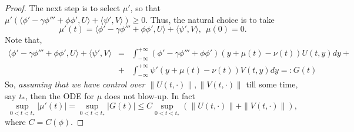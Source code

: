 \documentclass[12pt]{amsart}
\theoremstyle{definition}
\theoremstyle{remark}
\numberwithin{equation}{section}
\renewcommand{\(}{\left(}
\renewcommand{\)}{\right)}
\renewcommand{\[}{\left[}
\renewcommand{\]}{\right]}
\newcommand{\ga}{\gamma}
\newcommand{\dpr}[2]{\langle #1,#2 \rangle}
\begin{document}
\begin{proof}
 The next step is to select $\mu'$, so that $\mu'\left(\dpr{\phi'-\ga \phi'''+  \phi\phi'}{U} +\dpr{\psi'}{V}\right)\ge 0$. Thus, the natural choice  is to take  
 \begin{equation}
 	\label{300}
 	\mu'(t)= \dpr{\phi'-\ga \phi'''+  \phi\phi'}{U} +\dpr{\psi'}{V}, \ \ \mu(0)=0. 
 \end{equation}
% 		
 Note that, 
 	\begin{eqnarray*}
 \dpr{\phi'-\ga \phi'''+  \phi\phi'}{U} +\dpr{\psi'}{V} &=&  \int_{-\infty}^{+\infty} (\phi'-\ga \phi'''+\phi\phi')(y+\mu(t)-\nu(t)) U(t,y) dy +  \\
 &+& 
\int_{-\infty}^{+\infty}  \psi'(y+\mu(t)-\nu(t)) V(t, y) dy=:G(t)
	\end{eqnarray*}
So, {\it assuming that we have control over $\|U(t, \cdot)\|, \|V(t, \cdot)\|$} till some time, say $t_*$, then the ODE for $\mu$ does not blow-up. In fact 
\begin{equation}
	\label{3001}
	\sup_{0<t<t_*}|\mu'(t)|=\sup_{0<t<t_*} |G(t)|\leq C \sup_{0<t<t_*}(\|U(t, \cdot)\|+ \|V(t, \cdot)\|),
\end{equation}
where $C=C(\phi)$. 


\end{proof}
\end{document}

